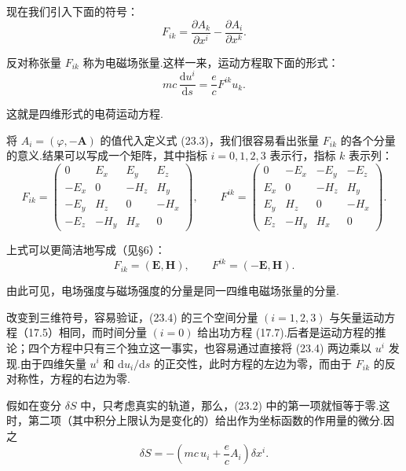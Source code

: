 现在我们引入下面的符号：
\begin{equation}
  F_{ik}=\frac{\partial A_k}{\partial x^i}-\frac{\partial A_i}{\partial x^k}.
\end{equation}

反对称张量 $F_{ik}$ 称为电磁场张量.这样一来，运动方程取下面的形式：
\begin{equation}
  mc\,\frac{\mathrm{d}u^i}{\mathrm{d}s}=\frac{e}{c}F^{ik}u_k.
\end{equation}

这就是四维形式的电荷运动方程.

将 $A_i=(\varphi,-\boldsymbol{A})$ 的值代入定义式 (23.3)，我们很容易看出张量 $F_{ik}$
的各个分量的意义.结果可以写成一个矩阵，其中指标 $i=0,1,2,3$ 表示行，指标 $k$ 表示列：
\begin{equation}
  F_{ik}=
  \begin{pmatrix}
    0 & E_x & E_y & E_z\\
    -E_x & 0 & -H_z & H_y\\
    -E_y & H_z & 0 & -H_x\\
    -E_z & -H_y & H_x & 0
  \end{pmatrix},
  \qquad
  F^{ik}=
  \begin{pmatrix}
    0 & -E_x & -E_y & -E_z\\
    E_x & 0 & -H_z & H_y\\
    E_y & H_z & 0 & -H_x\\
    E_z & -H_y & H_x & 0
  \end{pmatrix}.
\end{equation}

上式可以更简洁地写成（见§6）：
\begin{equation*}
  F_{ik}=(\boldsymbol{E},\boldsymbol{H}),\qquad
  F^{ik}=(-\boldsymbol{E},\boldsymbol{H}).
\end{equation*}

由此可见，电场强度与磁场强度的分量是同一四维电磁场张量的分量.

改变到三维符号，容易验证，(23.4) 的三个空间分量 $(i=1,2,3)$ 与矢量运动方程（17.5）相同，而时间分量
$(i=0)$ 给出功方程 (17.7).后者是运动方程的推论；四个方程中只有三个独立这一事实，也容易通过直接将 (23.4)
两边乘以 $u^i$ 发现.由于四维矢量 $u^i$ 和 $\mathrm{d}u_i/\mathrm{d}s$ 的正交性，此时方程的左边为零，而由于
$F_{ik}$ 的反对称性，方程的右边为零.

假如在变分 $\delta S$ 中，只考虑真实的轨道，那么，(23.2) 中的第一项就恒等于零.这时，第二项（其中积分上限认为是变化的）给出作为坐标函数的作用量的微分.因之
\begin{equation}
  \delta S=-\left(mc\,u_i+\frac{e}{c}A_i\right)\delta x^i.
\end{equation}

